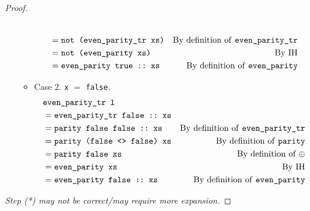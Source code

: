 \documentclass[12pt]{article}
\theoremstyle{plain}
\begin{document}
\begin{proof}
\begin{itemize}
\begin{itemize}
\begin{align*}
        \\ & = \texttt{not (even\_parity\_tr xs)} & \text{By
                                                    definition of \texttt{even\_parity\_tr}}
        \\ & = \texttt{not (even\_parity xs)} & \text{By IH}
        \\ & = \texttt{even\_parity true ::\ xs} & \text{By definition
                                                   of \texttt{even\_parity}}
      \end{align*}
    \item Case 2. \texttt{x} $=$ \texttt{false}.
      \begin{align*}
        & \texttt{even\_parity\_tr l}
        \\ & = \texttt{even\_parity\_tr false ::\ xs}
        \\ & = \texttt{parity false false ::\ xs} & \text{By
                                                    definition of \texttt{even\_parity\_tr}}
        \\ & = \texttt{parity (false <> false) xs} & \text{By
                                                     definition of \texttt{parity}}
        \\ & = \texttt{parity false xs} & \text{By definition of $\oplus$}
        \\ & = \texttt{even\_parity xs} & \text{By IH}
        \\ & = \texttt{even\_parity false ::\ xs} & \text{By
                                                    definition of \texttt{even\_parity}}
      \end{align*}
    \end{itemize}
  \end{itemize}
  \textit{Step (*) may not be correct/may require more expansion.}
\end{proof}
\end{document}
